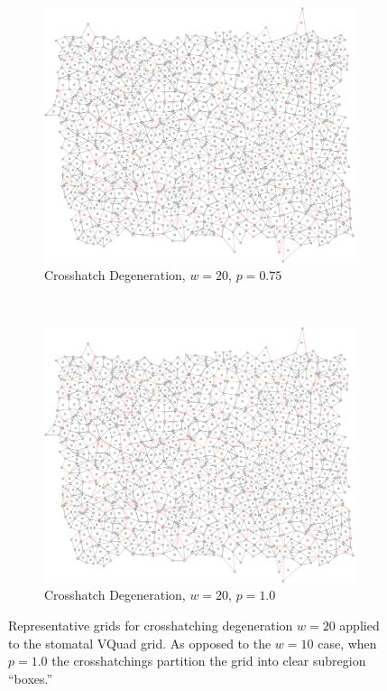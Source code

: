 \documentclass[a4paper,11pt]{report}
\begin{document}
\begin{figure}[htp]
\begin{subfigure}[t]{0.4\textwidth}
  \end{subfigure}

\begin{subfigure}[t]{0.4\textwidth}
  \centering
  \includegraphics[width=\textwidth]{ch6_figs/cross_hatch_p75_w20}
  \caption{Crosshatch Degeneration, $w=20$, $p=0.75$}

  \end{subfigure}
~
\begin{subfigure}[t]{0.4\textwidth}
  \centering
  \includegraphics[width=\textwidth]{ch6_figs/cross_hatch_p100_w20}
  \caption{Crosshatch Degeneration, $w=20$, $p=1.0$}

  \end{subfigure}

\caption[Crosshatch Degeneration, $w=20$]{
  Representative grids for crosshatching degeneration $w=20$ applied to the stomatal VQuad grid. As opposed to the $w=10$ case, when $p=1.0$ the crosshatchings partition the grid into clear subregion ``boxes.''
}
\label{fig:ch_w20_grid}
\end{figure}
\end{document}
